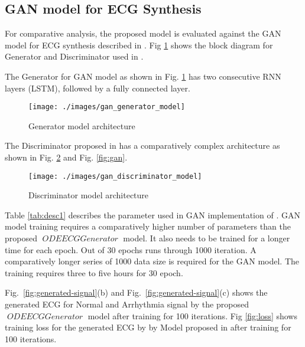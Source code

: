 \documentclass{article}
\DeclareMathOperator{\ODEECGGenerator}{\textit{ODEECGGenerator}}
\begin{document}
\subsection{GAN model for ECG Synthesis}
For comparative analysis, the proposed model is evaluated against the GAN model for ECG synthesis described in \cite{delaney2019synthesis}. Fig \ref{fig:gan_model} shows the block diagram for Generator and Discriminator used in \cite{delaney2019synthesis}.

\begin{figure*}[http]
\hfill
{}
\hfill
{}
\caption{Block Daigram for Generator and Discriminator for GAN model for ECG synthesis described in \cite{delaney2019synthesis}}
\label{fig:gan}
\end{figure*}

The Generator for GAN model \cite{delaney2019synthesis} as shown in Fig. \ref{fig:gan_model} has two consecutive RNN layers (LSTM), followed by a fully connected layer. 


\begin{figure}[htb]
    \centering
    \texttt{[image: ./images/gan\_generator\_model]}
    \caption{Generator model architecture}
    \label{fig:gan_model}
\end{figure}

The Discriminator proposed in \cite{delaney2019synthesis} has a comparatively complex architecture as shown in Fig. \ref{fig:desc_model} and Fig. \ref{fig:gan}.


\begin{figure}[htb]
    \centering
    \texttt{[image: ./images/gan\_discriminator\_model]}
    \caption{Discriminator model architecture}
    \label{fig:desc_model}
\end{figure}


Table \ref{tab:desc1} describes the parameter used in GAN implementation of \cite{delaney2019synthesis}. GAN model training requires a comparatively higher number of parameters than the proposed  $\ODEECGGenerator$ model. It also needs to be trained for a longer time for each epoch. Out of 30 epochs runs through 1000 iteration. A comparatively longer series of 1000 data size is required for the GAN model. The training requires three to five hours for 30 epoch. 

Fig.~\ref{fig:generated-signal}(b) and Fig.~\ref{fig:generated-signal}(c) shows the generated ECG for Normal and Arrhythmia signal by the proposed $\ODEECGGenerator$ model after training for 100 iterations.  Fig \ref{fig:loss} shows training loss for the generated ECG by by Model proposed in \cite{delaney2019synthesis} after training for 100 iterations.
\end{document}
